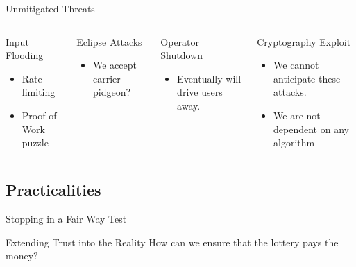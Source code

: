 \begin{frame}{Unmitigated Threats}
    \begin{columns}[T,onlytextwidth]

        \begin{block}{Input Flooding}
          \begin{itemize}
              \item Rate limiting
              \item Proof-of-Work puzzle
          \end{itemize}
        \end{block}
    
        \begin{block}{Eclipse Attacks}
            \begin{itemize}
                \item We accept carrier pidgeon?
            \end{itemize}
        \end{block}
    
    
        \begin{block}{Operator Shutdown}
            \begin{itemize}
                \item Eventually will drive users away.
            \end{itemize}
        \end{block}
    
        \begin{block}{Cryptography Exploit}
            \begin{itemize}
                \item We cannot anticipate these attacks.
                \item We are not dependent on any algorithm
            \end{itemize}
        \end{block}
    
      \end{columns}
\end{frame}

\subsection{Practicalities}

\begin{frame}{Stopping in a Fair Way}
    \centering
    Test
\end{frame}

\begin{frame}{Extending Trust into the Reality}
    \centering
    How can we ensure that the lottery pays the money?
\end{frame}
